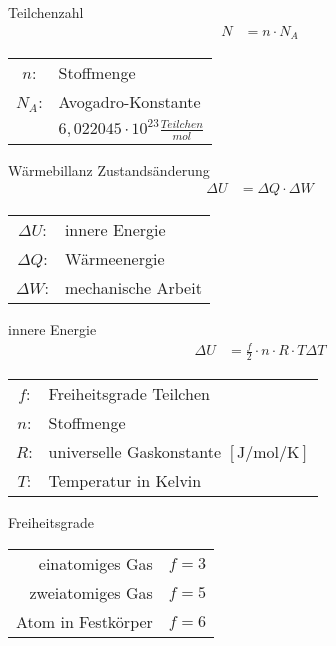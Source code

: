 \begin{karte}{Teilchenzahl}
    \begin{align*}
        N &= n \cdot N_A
    \end{align*}
    \begin{tabular}[t]{cl}
        \( n \): & Stoffmenge \\
        \( N_A \): & Avogadro-Konstante \\
        & \( 6,022045 \cdot 10^{23} \tfrac{Teilchen}{mol}\)
    \end{tabular}
\end{karte}

\begin{karte}{Wärmebillanz Zustandsänderung}
    \begin{align*}
        \Delta U &= \Delta Q \cdot \Delta W
    \end{align*}
    \begin{tabular}[t]{cl}
        \( \Delta U \): & innere Energie\\
        \( \Delta Q\): & Wärmeenergie \\
        \( \Delta W \): & mechanische Arbeit \\
    \end{tabular}
\end{karte}

\begin{karte}{innere Energie}
    \begin{align*}
        \Delta U &= \tfrac{f}{2}\cdot n \cdot  R \cdot  T \Delta T
    \end{align*}
    \begin{tabular}[t]{cl}
        \( f \): & Freiheitsgrade Teilchen \\
        \( n \): & Stoffmenge \\
        \( R \): & universelle Gaskonstante \([ \si{\joule\per\mol\per\kelvin} ] \)\\
        \( T \): & Temperatur in Kelvin\\
    \end{tabular}
\end{karte}

\begin{karte}{Freiheitsgrade}
    \begin{tabular}[t]{rc}
        einatomiges Gas & \( f = 3 \) \\
        zweiatomiges Gas & \( f = 5 \) \\
        Atom in Festkörper & \( f = 6 \)
    \end{tabular}
\end{karte}

